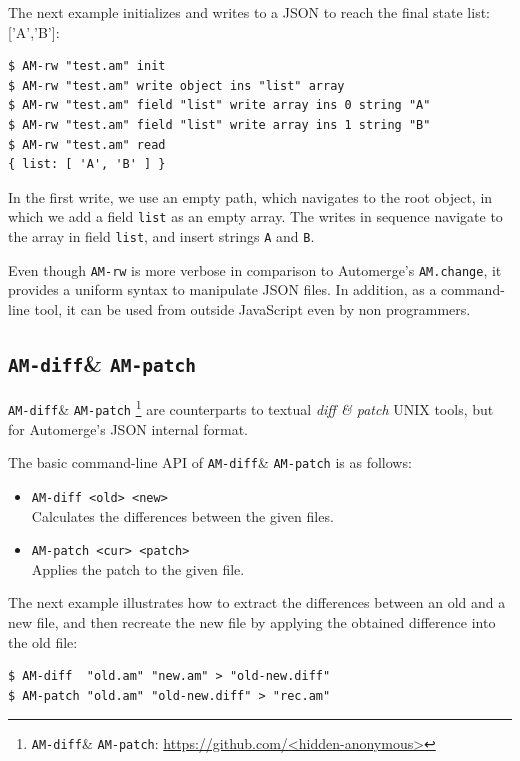 \documentclass[12pt]{article}
\newcommand{\code}[1]  {\texttt{\footnotesize{#1}}}
\newcommand{\amrw}       {\texttt{AM-rw}\xspace}
\newcommand{\amdiff}     {\texttt{AM-diff}\xspace}
\newcommand{\ampatch}    {\texttt{AM-patch}\xspace}
\begin{document}
The next example initializes and writes to a JSON to reach the final state
{list: ['A','B']}:

\begin{verbatim}
$ AM-rw "test.am" init
$ AM-rw "test.am" write object ins "list" array
$ AM-rw "test.am" field "list" write array ins 0 string "A"
$ AM-rw "test.am" field "list" write array ins 1 string "B"
$ AM-rw "test.am" read
{ list: [ 'A', 'B' ] }
\end{verbatim}

In the first write, we use an empty path, which navigates to the root object,
in which we add a field \code{list} as an empty array.
The writes in sequence navigate to the array in field \code{list}, and insert
strings \code{A} and \code{B}.

Even though \amrw is more verbose in comparison to Automerge's
\code{AM.change}, it provides a uniform syntax to manipulate JSON files.
In addition, as a command-line tool, it can be used from outside JavaScript
even by non programmers.

\subsection{\amdiff \& \ampatch}

\amdiff \& \ampatch%
    \footnote{\amdiff \& \ampatch: \url{https://github.com/<hidden-anonymous>}}
are counterparts to textual \emph{diff \& patch} UNIX tools, but for
Automerge's JSON internal format.

The basic command-line API of \amdiff \& \ampatch is as follows:

\begin{itemize}
\item \code{AM-diff <old> <new>} \\
    Calculates the differences between the given files.
\item \code{AM-patch <cur> <patch>} \\
    Applies the patch to the given file.
\end{itemize}

The next example illustrates how to extract the differences between an old and
a new file, and then recreate the new file by applying the obtained difference
into the old file:

\begin{verbatim}
$ AM-diff  "old.am" "new.am" > "old-new.diff"
$ AM-patch "old.am" "old-new.diff" > "rec.am"
\end{verbatim}
\end{document}
